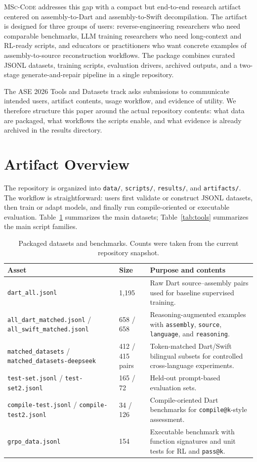\documentclass[sigconf,review]{acmart}
\begin{document}
\textsc{MSc-Code} addresses this gap with a compact but end-to-end research artifact centered on assembly-to-Dart and assembly-to-Swift decompilation. The artifact is designed for three groups of users: reverse-engineering researchers who need comparable benchmarks, LLM training researchers who need long-context and RL-ready scripts, and educators or practitioners who want concrete examples of assembly-to-source reconstruction workflows. The package combines curated JSONL datasets, training scripts, evaluation drivers, archived outputs, and a two-stage generate-and-repair pipeline in a single repository.

The ASE 2026 Tools and Datasets track asks submissions to communicate intended users, artifact contents, usage workflow, and evidence of utility. We therefore structure this paper around the actual repository contents: what data are packaged, what workflows the scripts enable, and what evidence is already archived in the results directory.

\section{Artifact Overview}
The repository is organized into \texttt{data/}, \texttt{scripts/}, \texttt{results/}, and \texttt{artifacts/}. The workflow is straightforward: users first validate or construct JSONL datasets, then train or adapt models, and finally run compile-oriented or executable evaluation. Table~\ref{tab:data} summarizes the main datasets; Table~\ref{tab:tools} summarizes the main script families.

\begin{table}[t]
\caption{Packaged datasets and benchmarks. Counts were taken from the current repository snapshot.}
\label{tab:data}
\centering
\footnotesize
\begin{tabular}{p{}p{}p{}}
\toprule
\textbf{Asset} & \textbf{Size} & \textbf{Purpose and contents} \\
\midrule
\texttt{dart\_all.jsonl} & 1,195 & Raw Dart source--assembly pairs used for baseline supervised training. \\
\texttt{all\_dart\_matched.jsonl} / \texttt{all\_swift\_matched.jsonl} & 658 / 658 & Reasoning-augmented examples with \texttt{assembly}, \texttt{source}, \texttt{language}, and \texttt{reasoning}. \\
\texttt{matched\_datasets} / \texttt{matched\_datasets-deepseek} & 412 / 415 pairs & Token-matched Dart/Swift bilingual subsets for controlled cross-language experiments. \\
\texttt{test-set.jsonl} / \texttt{test-set2.jsonl} & 165 / 72 & Held-out prompt-based evaluation sets. \\
\texttt{compile-test.jsonl} / \texttt{compile-test2.jsonl} & 34 / 126 & Compile-oriented Dart benchmarks for \texttt{compile@k}-style assessment. \\
\texttt{grpo\_data.jsonl} & 154 & Executable benchmark with function signatures and unit tests for RL and \texttt{pass@k}. \\
\bottomrule
\end{tabular}
\end{table}
\end{document}
